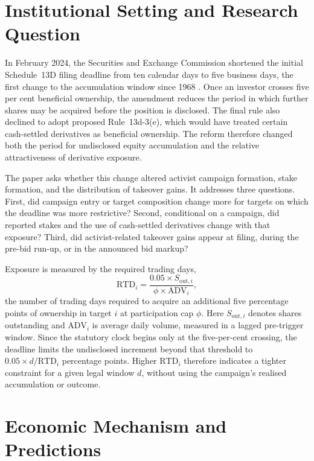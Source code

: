 \section{Institutional Setting and Research Question}
\label{sec:setting}

In February 2024, the Securities and Exchange Commission shortened the initial
Schedule~13D filing deadline from ten calendar days to five business days, the
first change to the accumulation window since 1968
\parencite{sec2023modernization}. Once an investor crosses five per cent
beneficial ownership, the amendment reduces the period in which further shares
may be acquired before the position is disclosed. The final rule also declined
to adopt proposed Rule~13d-3(e), which would have treated certain cash-settled
derivatives as beneficial ownership. The reform therefore changed both the
period for undisclosed equity accumulation and the relative attractiveness of
derivative exposure.

The paper asks whether this change altered activist campaign formation, stake
formation, and the distribution of takeover gains. It addresses three
questions. First, did campaign entry or target composition change more for
targets on which the deadline was more restrictive? Second, conditional on a
campaign, did reported stakes and the use of cash-settled derivatives change
with that exposure? Third, did activist-related takeover gains appear at filing,
during the pre-bid run-up, or in the announced bid markup?

Exposure is measured by the required trading days,
\begin{equation}
\mathrm{RTD}_i
=\frac{0.05\times S_{\mathrm{out},i}}{\phi\times\mathrm{ADV}_i},
\label{eq:rtd-intro}
\end{equation}
the number of trading days required to acquire an additional five percentage
points of ownership in target $i$ at participation cap $\phi$. Here
$S_{\mathrm{out},i}$ denotes shares
outstanding and $\mathrm{ADV}_i$ is average daily volume, measured in a lagged
pre-trigger window. Since the statutory clock begins only at the five-per-cent
crossing, the deadline limits the undisclosed increment beyond that threshold
to $0.05\times d/\mathrm{RTD}_i$ percentage points. Higher
$\mathrm{RTD}_i$ therefore indicates a tighter constraint for a given legal
window $d$, without using the campaign's realised accumulation or outcome.

\section{Economic Mechanism and Predictions}
\label{sec:predictions}

